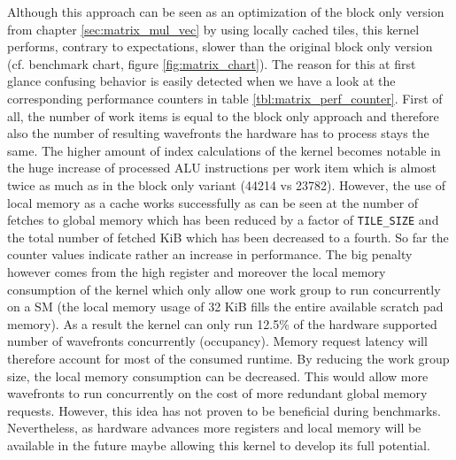 

Although this approach can be seen as an optimization of the block only version from chapter \ref{sec:matrix_mul_vec} by using locally cached tiles, this kernel performs, contrary to expectations, slower than the original block only version (cf. benchmark chart, figure \ref{fig:matrix_chart}). The reason for this at first glance confusing behavior is easily detected when we have a look at the corresponding performance counters in table \ref{tbl:matrix_perf_counter}.
First of all, the number of work items is equal to the block only approach and therefore also the number of resulting wavefronts the hardware has to process stays the same. The higher amount of index calculations of the kernel becomes notable in the huge increase of processed ALU instructions per work item which is almost twice as much as in the block only variant (44214 vs 23782). However, the use of local memory as a cache works successfully as can be seen at the number of fetches to global memory which has been reduced by a factor of \lstinline!TILE_SIZE! and the total number of fetched KiB which has been decreased to a fourth. So far the counter values indicate rather an increase in performance. The big penalty however comes from the high register and moreover the local memory consumption of the kernel which only allow one work group to run concurrently on a SM (the local memory usage of 32 KiB fills the entire available scratch pad memory). As a result the kernel can only run 12.5\% of the hardware supported number of wavefronts concurrently (occupancy). Memory request latency will therefore account for most of the consumed runtime. By reducing the work group size, the local memory consumption can be decreased. This would allow more wavefronts to run concurrently on the cost of more redundant global memory requests. However, this idea has not proven to be beneficial during benchmarks. Nevertheless, as hardware advances more registers and local memory will be available in the future maybe allowing this kernel to develop its full potential. 

